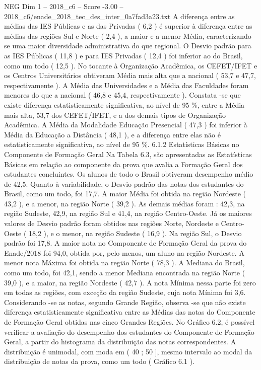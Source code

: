\begin{textsample}{NEG Dim 1 – 2018\_c6 – Score -3.00 – 2018\_c6/enade\_2018\_tec\_des\_inter\_0a7fad3a23.txt}
A diferença entre as médias das IES Públicas e as das Privadas ( 6,2 ) é superior à diferença entre as médias das regiões Sul e Norte ( 2,4 ), a maior e a menor Média, caracterizando -se uma maior diversidade administrativa do que regional.
O Desvio padrão para as IES Públicas ( 11,8 ) e para IES Privadas ( 12,4 ) foi inferior ao do Brasil, como um todo ( 12,5 ).
No tocante à Organização Acadêmica, os CEFET/IFET e os Centros Universitários obtiveram Média mais alta que a nacional ( 53,7 e 47,7, respectivamente ).
A Média das Universidades e a Média das Faculdades foram menores do que a nacional ( 46,8 e 45,4, respectivamente ).
Constata -se que existe diferença estatisticamente significativa, ao nível de 95 \%, entre a Média mais alta, 53,7 dos CEFET/IFET, e a dos demais tipos de Organização Acadêmica.
A Média da Modalidade Educação Presencial ( 47,3 ) foi inferior à Média da Educação a Distância ( 48,1 ), e a diferença entre elas não é estatisticamente significativa, ao nível de 95 \%. 6.1.2 Estatísticas Básicas no Componente de Formação Geral Na Tabela 6.3, são apresentadas as Estatísticas Básicas em relação ao componente da prova que avalia a Formação Geral dos estudantes concluintes.
Os alunos de todo o Brasil obtiveram desempenho médio de 42,5.
Quanto à variabilidade, o Desvio padrão das notas dos estudantes do Brasil, como um todo, foi 17,7.
A maior Média foi obtida na região Nordeste ( 43,2 ), e a menor, na região Norte ( 39,2 ).
As demais médias foram : 42,3, na região Sudeste, 42,9, na região Sul e 41,4, na região Centro-Oeste.
Já os maiores valores de Desvio padrão foram obtidos nas regiões Norte, Nordeste e Centro-Oeste ( 18,2 ), e o menor, na região Sudeste ( 16,9 ).
Na região Sul, o Desvio padrão foi 17,8.
A maior nota no Componente de Formação Geral da prova do Enade/2018 foi 94,0, obtida por, pelo menos, um aluno na região Nordeste.
A menor nota Máxima foi obtida na região Norte ( 78,3 ).
A Mediana do Brasil, como um todo, foi 42,1, sendo a menor Mediana encontrada na região Norte ( 39,0 ), e a maior, na região Nordeste ( 42,7 ).
A nota Mínima nessa parte foi zero em todas as regiões, com exceção da região Sudeste, cuja nota Mínima foi 3,6.
Considerando -se as notas, segundo Grande Região, observa -se que não existe diferença estatisticamente significativa entre as Médias das notas do Componente de Formação Geral obtidas nas cinco Grandes Regiões.
No Gráfico 6.2, é possível verificar a avaliação do desempenho dos estudantes do Componente de Formação Geral, a partir do histograma da distribuição das notas correspondentes.
A distribuição é unimodal, com moda em ( 40 ; 50 ], mesmo intervalo ao modal da distribuição de notas da prova, como um todo ( Gráfico 6.1 ).

\end{textsample}
